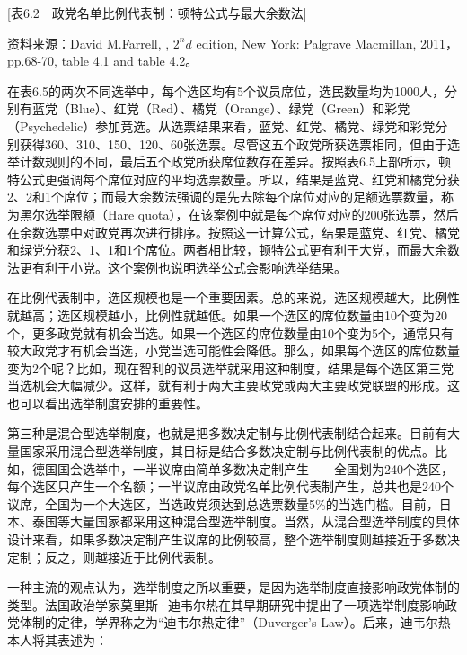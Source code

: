 [表6.2　政党名单比例代表制：顿特公式与最大余数法]

资料来源：David M.Farrell, , $2^nd$ edition, New York: Palgrave Macmillan, 2011，pp.68-70, table 4.1 and table 4.2。

在表6.5的两次不同选举中，每个选区均有5个议员席位，选民数量均为1000人，分别有蓝党（Blue）、红党（Red）、橘党（Orange）、绿党（Green）和彩党（Psychedelic）参加竞选。从选票结果来看，蓝党、红党、橘党、绿党和彩党分别获得360、310、150、120、60张选票。尽管这五个政党所获选票相同，但由于选举计数规则的不同，最后五个政党所获席位数存在差异。按照表6.5上部所示，顿特公式更强调每个席位对应的平均选票数量。所以，结果是蓝党、红党和橘党分获2、2和1个席位；而最大余数法强调的是先去除每个席位对应的足额选票数量，称为黑尔选举限额（Hare quota），在该案例中就是每个席位对应的200张选票，然后在余数选票中对政党再次进行排序。按照这一计算公式，结果是蓝党、红党、橘党和绿党分获2、1、1和1个席位。两者相比较，顿特公式更有利于大党，而最大余数法更有利于小党。这个案例也说明选举公式会影响选举结果。

在比例代表制中，选区规模也是一个重要因素。总的来说，选区规模越大，比例性就越高；选区规模越小，比例性就越低。如果一个选区的席位数量由10个变为20个，更多政党就有机会当选。如果一个选区的席位数量由10个变为5个，通常只有较大政党才有机会当选，小党当选可能性会降低。那么，如果每个选区的席位数量变为2个呢？比如，现在智利的议员选举就采用这种制度，结果是每个选区第三党当选机会大幅减少。这样，就有利于两大主要政党或两大主要政党联盟的形成。这也可以看出选举制度安排的重要性。

第三种是混合型选举制度，也就是把多数决定制与比例代表制结合起来。目前有大量国家采用混合型选举制度，其目标是结合多数决定制与比例代表制的优点。比如，德国国会选举中，一半议席由简单多数决定制产生——全国划为240个选区，每个选区只产生一个名额；一半议席由政党名单比例代表制产生，总共也是240个议席，全国为一个大选区，当选政党须达到总选票数量5\%的当选门槛。目前，日本、泰国等大量国家都采用这种混合型选举制度。当然，从混合型选举制度的具体设计来看，如果多数决定制产生议席的比例较高，整个选举制度则越接近于多数决定制；反之，则越接近于比例代表制。

一种主流的观点认为，选举制度之所以重要，是因为选举制度直接影响政党体制的类型。法国政治学家莫里斯·迪韦尔热在其早期研究中提出了一项选举制度影响政党体制的定律，学界称之为“迪韦尔热定律”（Duverger's Law）。后来，迪韦尔热本人将其表述为：


